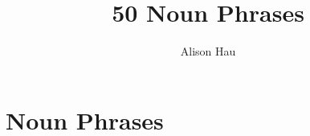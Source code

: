 \documentclass{article}
\title{50 Noun Phrases}
\author{Alison Hau\vspace{-2ex}}
\date{}
\begin{document}
\maketitle
 
\section{Noun Phrases}


\end{document}

